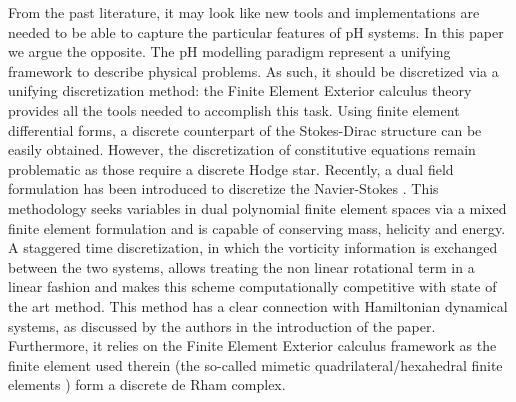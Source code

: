 \documentclass{elsarticle}
\begin{document}
From the past literature, it may look like new tools and implementations are needed to be able to capture the particular features of pH systems. In this paper we argue the opposite. The pH modelling paradigm represent a unifying framework to describe physical problems. As such, it should be discretized via a unifying discretization method: the Finite Element Exterior calculus theory  \cite{arnold2006acta} provides all the tools needed to accomplish this task. Using finite element differential forms, a discrete counterpart of the Stokes-Dirac structure can be easily obtained. However, the discretization of constitutive equations remain problematic as those require a discrete Hodge star. Recently, a dual field formulation has been introduced to discretize the Navier-Stokes \cite{zhang2021mass}. This methodology seeks variables in dual polynomial finite element spaces via a mixed finite element formulation and is capable of conserving mass, helicity and energy. A staggered time discretization, in which the vorticity information is exchanged between the two systems, allows treating the non linear rotational term in a linear fashion and makes this scheme computationally competitive with state of the art method. 
This method has a clear connection with Hamiltonian dynamical systems, as discussed by the authors in the introduction of the paper. Furthermore, it relies on the Finite Element Exterior calculus framework as the finite element used therein (the so-called mimetic quadrilateral/hexahedral finite elements \cite{palha2014mimetic}) form a discrete de Rham complex. \\
\end{document}
